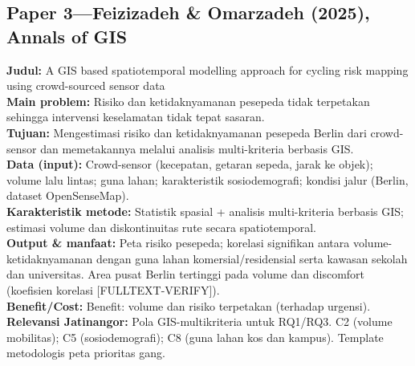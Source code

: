 \documentclass[a4paper,11pt]{article}
\begin{document}
\subsection*{Paper 3---Feizizadeh \& Omarzadeh (2025), Annals of GIS}
\textbf{Judul:} A GIS based spatiotemporal modelling approach for cycling risk mapping using crowd-sourced sensor data\\
\textbf{Main problem:} Risiko dan ketidaknyamanan pesepeda tidak terpetakan sehingga intervensi keselamatan tidak tepat sasaran.\\
\textbf{Tujuan:} Mengestimasi risiko dan ketidaknyamanan pesepeda Berlin dari crowd-sensor dan memetakannya melalui analisis multi-kriteria berbasis GIS.\\
\textbf{Data (input):} Crowd-sensor (kecepatan, getaran sepeda, jarak ke objek); volume lalu lintas; guna lahan; karakteristik sosiodemografi; kondisi jalur (Berlin, dataset OpenSenseMap).\\
\textbf{Karakteristik metode:} Statistik spasial + analisis multi-kriteria berbasis GIS; estimasi volume dan diskontinuitas rute secara spatiotemporal.\\
\textbf{Output \& manfaat:} Peta risiko pesepeda; korelasi signifikan antara volume-ketidaknyamanan dengan guna lahan komersial/residensial serta kawasan sekolah dan universitas. Area pusat Berlin tertinggi pada volume dan discomfort (koefisien korelasi [FULLTEXT-VERIFY]).\\
\textbf{Benefit/Cost:} Benefit: volume dan risiko terpetakan (terhadap urgensi).\\
\textbf{Relevansi Jatinangor:} Pola GIS-multikriteria untuk RQ1/RQ3. C2 (volume mobilitas); C5 (sosiodemografi); C8 (guna lahan kos dan kampus). Template metodologis peta prioritas gang.
\end{document}
